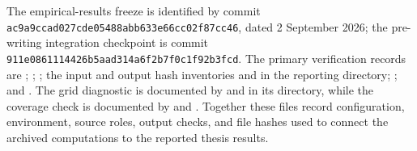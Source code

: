 The empirical-results freeze is identified by commit \texttt{ac9a9ccad027cde05488abb633e66cc02f87cc46}, dated 2 September 2026; the pre-writing integration checkpoint is commit \texttt{911e0861114426b5aad314a6f2b7f0c1f92b3fcd}. The primary verification records are ; ; ; the input and output hash inventories  and  in the reporting directory; ; and . The grid diagnostic is documented by  and  in its directory, while the coverage check is documented by  and . Together these files record configuration, environment, source roles, output checks, and file hashes used to connect the archived computations to the reported thesis results.
